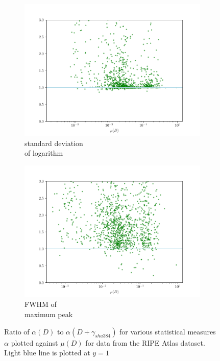 \documentclass[12pt,a4paper,automark, toc=bib]{scrreprt}
\theoremstyle{definition}
\begin{document}
\begin{figure}
\begin{subfigure}{0.32\linewidth}
			\includegraphics[width=\linewidth]{figures/stat_sha384_0log_std_div.pdf}
			\caption{standard deviation\\of logarithm}
		\end{subfigure}
		\begin{subfigure}{0.32\linewidth}
			\includegraphics[width=\linewidth]{figures/stat_sha384_0FWHM_div.pdf}
			\caption{FWHM of\\maximum peak}
		\end{subfigure}
		\begin{subfigure}{0.32\linewidth}
			\hphantom{a}
		\end{subfigure}
		\caption{Ratio of $\alpha(D)$ to $\alpha(D + \gamma_{sha384})$ for various statistical measures $\alpha$ plotted against $\mu(D)$ for data from the RIPE Atlas dataset. Light blue line is plotted at $y=1$}%
		\label{stat-mes-fig}%
	\end{figure}
\end{document}
